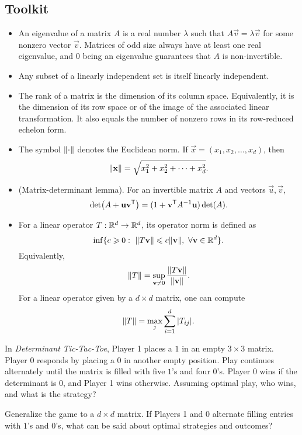 \documentclass[12pt]{memoir}
\begin{document}
\subsection*{Toolkit}
\begin{itemize}
    \item An eigenvalue of a matrix $A$ is a real number $\lambda$ such that $A\vec{v}=\lambda\vec{v}$ for some nonzero vector $\vec{v}$. Matrices of odd size always have at least one real eigenvalue, and $0$ being an eigenvalue guarantees that $A$ is non-invertible.
    \item Any subset of a linearly independent set is itself linearly independent.
    \item The rank of a matrix is the dimension of its column space. Equivalently, it is the dimension of its row space or of the image of the associated linear transformation. It also equals the number of nonzero rows in its row-reduced echelon form.
    \item The symbol $\norm{\cdot}$ denotes the Euclidean norm. If $\vec{x}=(x_1,x_2,\dots,x_d)$, then
    \[
        \norm{\mathbf{x}}=\sqrt{x_1^2+x_2^2+\dots+x_d^2}.
    \]
    \item (Matrix-determinant lemma). For an invertible matrix $A$ and vectors $\vec{u},\vec{v}$,
    \[
        \det(A+\mathbf{u}\mathbf{v}^{\mathsf{T}})=(1+\mathbf{v}^{\mathsf{T}} A^{-1}\mathbf{u})\det(A).
    \]
    \item For a linear operator $T:\mathbb{R}^d\to\mathbb{R}^d$, its operator norm is defined as
    \[
        \inf\{c\geq 0:\ \norm{T\vec{v}}\leq c\norm{\vec{v}},\ \forall \vec{v}\in \bR^d\}.
    \]
    Equivalently,
    \[
        \norm{T}=\sup_{\mathbf{v}\neq 0}\frac{\norm{T\mathbf{v}}}{\norm{\mathbf{v}}}.
    \]
    For a linear operator given by a $d\times d$ matrix, one can compute
    \[
        \norm{T}=\max_j\sum_{i=1}^{d}|T_{ij}|.
    \]
\end{itemize}

\begin{Ej}
In \emph{Determinant Tic-Tac-Toe}, Player 1 places a $1$ in an empty $3\times 3$ matrix. Player 0 responds by placing a $0$ in another empty position. Play continues alternately until the matrix is filled with five $1$’s and four $0$’s. Player 0 wins if the determinant is $0$, and Player 1 wins otherwise. Assuming optimal play, who wins, and what is the strategy?
\end{Ej}

\begin{Ej}
Generalize the game to a $d\times d$ matrix. If Players 1 and 0 alternate filling entries with $1$’s and $0$’s, what can be said about optimal strategies and outcomes?
\end{Ej}
\end{document}
